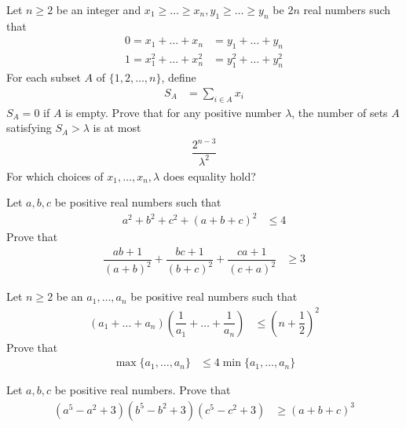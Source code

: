 \documentclass{subfile}
\begin{document}
		\begin{problem}
			Let $n\geq2$ be an integer and $x_{1}\geq\ldots\geq x_{n},y_{1}\geq\ldots\geq y_{n}$ be $2n$ real numbers such that
				\begin{align*}
					0 = x_{1}+\ldots+x_{n}
						& = y_{1}+\ldots+y_{n}\\
					1 = x_{1}^{2}+\ldots+x_{n}^{2}
						& = y_{1}^{2}+\ldots+y_{n}^{2}
				\end{align*}
			For each subset $A$ of $\{1,2,\ldots,n\}$, define
				\begin{align*}
					S_{A}
						& = \sum_{i\in A}x_{i}
				\end{align*}
			$S_{A}=0$ if $A$ is empty. Prove that for any positive number $\lambda$, the number of sets $A$ satisfying $S_{A}>\lambda$ is at most
				\begin{align*}
					\dfrac{2^{n-3}}{\lambda^{2}}
				\end{align*}
			For which choices of $x_{1},\ldots,x_{n},\lambda$ does equality hold?
		\end{problem}

		\begin{problem}
			Let $a,b,c$ be positive real numbers such that
				\begin{align*}
					a^{2}+b^{2}+c^{2}+(a+b+c)^{2}
						& \leq 4
				\end{align*}
			Prove that
				\begin{align*}
					\dfrac{ab+1}{(a+b)^{2}}+\dfrac{bc+1}{(b+c)^{2}}+\dfrac{ca+1}{(c+a)^{2}}
						& \geq3
				\end{align*}
		\end{problem}

		\begin{problem}
			Let $n\geq2$ be an $a_{1},\ldots,a_{n}$ be positive real numbers such that
				\begin{align*}
					(a_{1}+\ldots+a_{n})\left(\dfrac{1}{a_{1}}+\ldots+\dfrac{1}{a_{n}}\right)
						& \leq \left(n+\dfrac{1}{2}\right)^{2}
				\end{align*}
			Prove that
				\begin{align*}
					\max\{a_{1},\ldots,a_{n}\}
						& \leq4\min\{a_{1},\ldots,a_{n}\}
				\end{align*}
		\end{problem}

		\begin{problem}
			Let $a,b,c$ be positive real numbers. Prove that
				\begin{align*}
					(a^{5}-a^{2}+3)(b^{5}-b^{2}+3)(c^{5}-c^{2}+3)
						& \geq (a+b+c)^{3}
				\end{align*}
		\end{problem}
\end{document}
